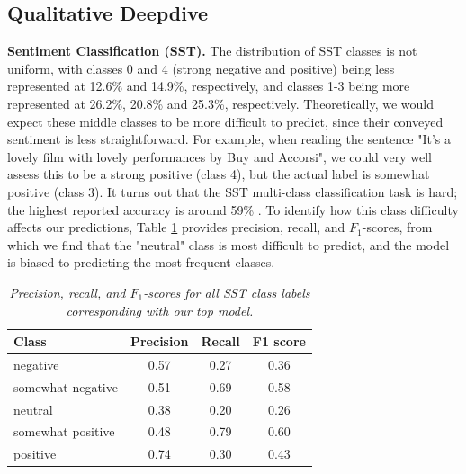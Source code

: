 \documentclass{article}
\begin{document}
\subsection{Qualitative Deepdive}
\label{sec: deepdive}

\textbf{Sentiment Classification (SST).} The distribution of SST classes is not uniform, with classes 0 and 4 (strong negative and positive) being less represented at 12.6\% and 14.9\%, respectively, and classes 1-3 being more represented at 26.2\%, 20.8\% and 25.3\%, respectively. Theoretically, we would expect these middle classes to be more difficult to predict, since their conveyed sentiment is less straightforward. For example, when reading the sentence "It's a lovely film with lovely performances by Buy and Accorsi", we could very well assess this to be a strong positive (class 4), but the actual label is somewhat positive (class 3). It turns out that the SST multi-class classification task is hard; the highest reported accuracy is around 59\% \cite{heinsen2022algorithm}. To identify how this class difficulty affects our predictions, Table \ref{tab: class-sst} provides precision, recall, and $F_1$-scores, from which we find that the "neutral" class is most difficult to predict, and the model is biased to predicting the most frequent classes.

\begin{table}
\footnotesize
\begin{tabular}{|l|ccc|} \hline
Class             & Precision & Recall & F1 score \\ \hline
negative          & 0.57      & 0.27   & 0.36     \\
somewhat negative & 0.51      & 0.69   & 0.58     \\
neutral           & 0.38      & 0.20   & 0.26     \\
somewhat positive & 0.48      & 0.79   & 0.60     \\
positive          & 0.74      & 0.30   & 0.43     \\ \hline
\end{tabular}
\caption{\textit{Precision, recall, and $F_1$-scores for all SST class labels corresponding with our top model.}}
\label{tab: class-sst}
\end{table}
\end{document}
